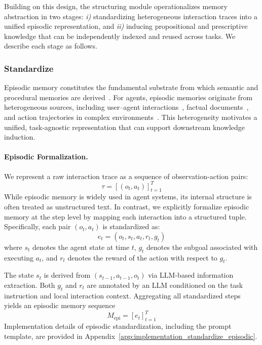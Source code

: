 Building on this design, the structuring module operationalizes memory abstraction in two stages: \textit{i)} standardizing heterogeneous interaction traces into a unified episodic representation, and \textit{ii)} inducing propositional and prescriptive knowledge that can be independently indexed and reused across tasks. We describe each stage as follows.


\subsubsection{Standardize}
\label{subsubsec:standardize}

Episodic memory constitutes the fundamental substrate from which semantic and procedural memories are derived~\citep{Tulving1972EpisodicSemantic}. 
For agents, episodic memories originate from heterogeneous sources, including user--agent interactions~\citep{wu2024longmemeval}, factual documents~\citep{yang2018hotpotqadatasetdiverseexplainable}, and action trajectories in complex environments~\citep{zhou2024webarenarealisticwebenvironment}. 
This heterogeneity motivates a unified, task-agnostic representation that can support downstream knowledge induction.

\paragraph{Episodic Formalization.}
We represent a raw interaction trace as a sequence of observation-action pairs:
\[
\tau = [(o_t, a_t)]_{t=1}^{T}
\]
While episodic memory is widely used in agent systems, its internal structure is often treated as unstructured text.
In contrast, we explicitly formalize episodic memory at the step level by mapping each interaction into a structured tuple. Specifically, each pair $(o_t, a_t)$ is standardized as:
\[
e_t = (o_t, s_t, a_t, r_t, g_t)
\]
where $s_t$ denotes the agent state at time $t$, $g_t$ denotes the subgoal associated with executing $a_t$, and $r_t$ denotes the reward of the action with respect to $g_t$.

The state $s_t$ is derived from $(s_{t-1}, a_{t-1}, o_t)$ via LLM-based information extraction.
Both $g_t$ and $r_t$ are annotated by an LLM conditioned on the task instruction and local interaction context.
Aggregating all standardized steps yields an episodic memory sequence
\[
M_{\text{epi}} = [e_t]_{t=1}^{T}
\]
Implementation details of episodic standardization, including the prompt template, are provided in Appendix~\ref{app:implementation_standardize_episodic}.


